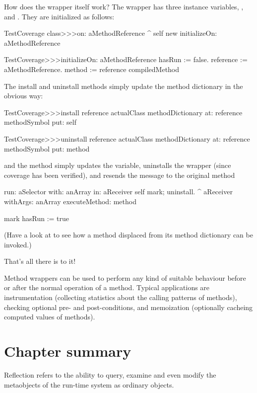 \documentclass[a4paper,10pt,twoside]{book}
\begin{document}
How does the wrapper itself work?
The  wrapper has three instance variables, ,  and .
They are initialized as follows:
\begin{code}{}
TestCoverage class>>>on: aMethodReference
	^ self new initializeOn: aMethodReference

TestCoverage>>>initializeOn: aMethodReference
	hasRun := false.
	reference := aMethodReference.
	method := reference compiledMethod
\end{code}

The install and uninstall methods simply update the method dictionary in the obvious way:
\begin{code}{}
TestCoverage>>>install
	reference actualClass methodDictionary
		at: reference methodSymbol
		put: self

TestCoverage>>>uninstall
	reference actualClass methodDictionary
		at: reference methodSymbol
		put: method
\end{code}
\noindent
and the  method simply updates the  variable, uninstalls the wrapper (since coverage has been verified), and resends the message to the original method
\begin{code}{}
run: aSelector with: anArray in: aReceiver
	self mark; uninstall.
	^ aReceiver withArgs: anArray executeMethod: method

mark
	hasRun := true
\end{code}
(Have a look at  to see how a method displaced from its method dictionary can be invoked.)

That's all there is to it!

Method wrappers can be used to perform any kind of suitable behaviour before or after the normal operation of a method.  Typical applications are instrumentation (collecting statistics about the calling patterns of methods), checking optional pre- and post-conditions, and memoization (optionally cacheing computed values of methods).

\section{Chapter summary}

Reflection refers to the ability to query, examine and even modify the metaobjects of the run-time system as ordinary objects.
\end{document}
